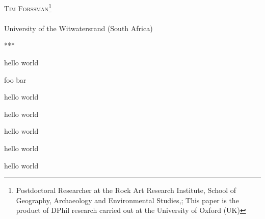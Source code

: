 \documentclass[
	year=2016,
	month=October,
	number=1,
	volume=2,
	]{ijsra}
\def\shortauthor{Tim Forssman}
\def\affiliation{University of the Witwatersrand (South Africa)}
\def\thanknote{Postdoctoral Researcher at the Rock Art Research Institute, School of Geography, Archaeology and Environmental Studies,; This paper is the product of DPhil research carried out at the University of Oxford (UK)}
\begin{document}
\IJSRAopening

	{\Large\scshape
	\shortauthor\footnote{\thanknote}}\\[1em]
	\email\\
	\affiliation

\IJSRAmid

\begin{IJSRAabstract}%
***
\end{IJSRAabstract}


hello world
\clearpage

foo bar


hello world
\newpage



hello world
\newpage


hello world
\newpage



hello world
\newpage



hello world
\nocite{*}
\IJSRAclosing
\end{document}
